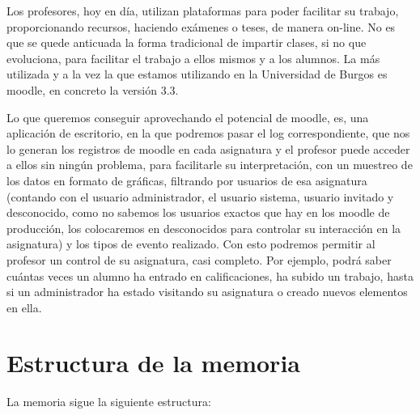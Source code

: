 
Los profesores, hoy en día, utilizan plataformas para poder facilitar su trabajo, proporcionando recursos, haciendo exámenes o teses, de manera on-line. No es que se quede anticuada la forma tradicional de impartir clases, si no que evoluciona, para facilitar el trabajo a ellos mismos y a los alumnos.
La más utilizada y a la vez la que estamos utilizando en la Universidad de Burgos es moodle, en concreto la versión 3.3.




Lo que queremos conseguir aprovechando el potencial de moodle, es, una aplicación de escritorio, en la que podremos pasar el log correspondiente, que nos lo generan los registros de moodle en cada asignatura y el profesor puede acceder a ellos sin ningún problema, para facilitarle su interpretación, con un muestreo de los datos en formato de gráficas, filtrando por usuarios de esa asignatura (contando con el usuario administrador, el usuario sistema, usuario invitado y desconocido, como no sabemos los usuarios exactos que hay en los moodle de producción, los colocaremos en desconocidos para controlar su interacción en la asignatura) y los tipos de evento realizado. 
Con esto podremos permitir al profesor un control de su asignatura, casi completo. Por ejemplo, podrá saber cuántas veces un alumno ha entrado en calificaciones, ha subido un trabajo, hasta si un administrador ha estado visitando su asignatura o creado nuevos elementos en ella.


\section{Estructura de la memoria}\label{estructura-de-la-memoria}

La memoria sigue la siguiente estructura:

